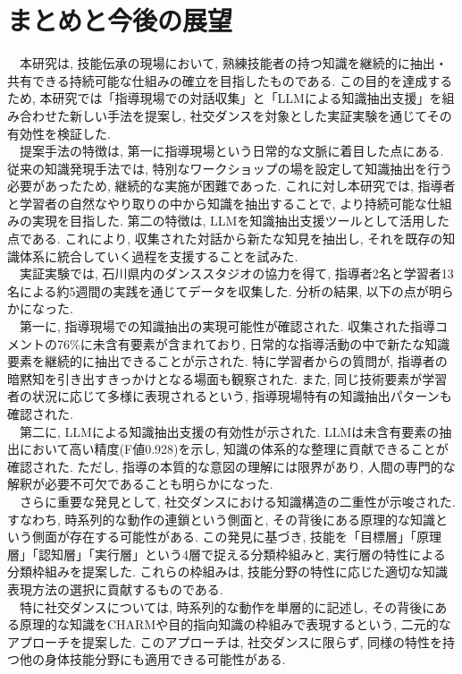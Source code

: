\chapter{まとめと今後の展望}
　本研究は, 技能伝承の現場において, 熟練技能者の持つ知識を継続的に抽出・共有できる持続可能な仕組みの確立を目指したものである. この目的を達成するため, 本研究では「指導現場での対話収集」と「LLMによる知識抽出支援」を組み合わせた新しい手法を提案し, 社交ダンスを対象とした実証実験を通じてその有効性を検証した.\\
　提案手法の特徴は, 第一に指導現場という日常的な文脈に着目した点にある. 従来の知識発現手法では, 特別なワークショップの場を設定して知識抽出を行う必要があったため, 継続的な実施が困難であった. これに対し本研究では, 指導者と学習者の自然なやり取りの中から知識を抽出することで, より持続可能な仕組みの実現を目指した. 第二の特徴は, LLMを知識抽出支援ツールとして活用した点である. これにより, 収集された対話から新たな知見を抽出し, それを既存の知識体系に統合していく過程を支援することを試みた.\\
　実証実験では, 石川県内のダンススタジオの協力を得て, 指導者2名と学習者13名による約5週間の実践を通じてデータを収集した. 分析の結果, 以下の点が明らかになった.\\
　第一に, 指導現場での知識抽出の実現可能性が確認された. 収集された指導コメントの76\%に未含有要素が含まれており, 日常的な指導活動の中で新たな知識要素を継続的に抽出できることが示された. 特に学習者からの質問が, 指導者の暗黙知を引き出すきっかけとなる場面も観察された. また, 同じ技術要素が学習者の状況に応じて多様に表現されるという, 指導現場特有の知識抽出パターンも確認された.\\
　第二に, LLMによる知識抽出支援の有効性が示された. LLMは未含有要素の抽出において高い精度(F値0.928)を示し, 知識の体系的な整理に貢献できることが確認された. ただし, 指導の本質的な意図の理解には限界があり, 人間の専門的な解釈が必要不可欠であることも明らかになった.\\
　さらに重要な発見として, 社交ダンスにおける知識構造の二重性が示唆された. すなわち, 時系列的な動作の連鎖という側面と, その背後にある原理的な知識という側面が存在する可能性がある. この発見に基づき, 技能を「目標層」「原理層」「認知層」「実行層」という4層で捉える分類枠組みと, 実行層の特性による分類枠組みを提案した. これらの枠組みは, 技能分野の特性に応じた適切な知識表現方法の選択に貢献するものである.\\
　特に社交ダンスについては, 時系列的な動作を単層的に記述し, その背後にある原理的な知識をCHARMや目的指向知識の枠組みで表現するという, 二元的なアプローチを提案した. このアプローチは, 社交ダンスに限らず, 同様の特性を持つ他の身体技能分野にも適用できる可能性がある.\\
